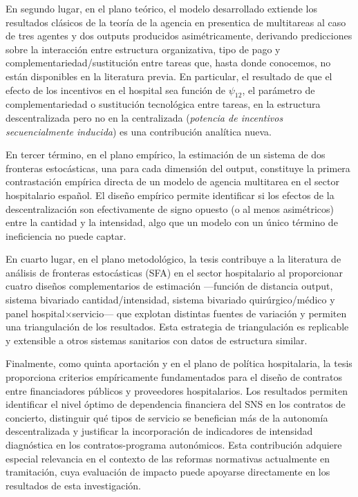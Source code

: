 En segundo lugar, en el plano teórico, el modelo desarrollado extiende los resultados clásicos de la teoría de la agencia en presentica de multitareas \citep{holmstrom1991} al caso de tres agentes y dos outputs producidos asimétricamente, derivando predicciones sobre la interacción entre estructura organizativa, tipo de pago y complementariedad/sustitución entre tareas que, hasta donde conocemos, no están disponibles en la literatura previa. En particular, el resultado de que el efecto de  los incentivos en el hospital sea función de $\psi_{12}$, el parámetro de complementariedad o sustitución tecnológica entre tareas, en la estructura descentralizada pero no en la centralizada (\textit{potencia de incentivos secuencialmente inducida}) es una contribución analítica nueva.

En tercer término, en el plano empírico, la estimación de un sistema de dos fronteras estocásticas, una para cada dimensión del output, constituye la primera contrastación empírica directa de un modelo de agencia multitarea en el sector hospitalario español. El diseño empírico permite identificar si los efectos de la descentralización son efectivamente de signo opuesto (o al menos asimétricos) entre la cantidad y la intensidad, algo que un modelo con un único término de ineficiencia no puede captar. %

En cuarto lugar, en el plano metodológico, la tesis contribuye a la literatura de análisis de fronteras estocásticas (SFA) en el sector hospitalario al proporcionar cuatro diseños complementarios de estimación ---función de distancia output, sistema bivariado cantidad/intensidad, sistema bivariado quirúrgico/médico y panel hospital$\times$servicio--- que explotan distintas fuentes de variación y permiten una triangulación de los resultados. Esta estrategia de triangulación es replicable y extensible a otros sistemas sanitarios con datos de estructura similar.

Finalmente, como quinta aportación y en el plano de política hospitalaria, la tesis 
proporciona criterios empíricamente fundamentados para el diseño 
de contratos entre financiadores públicos y proveedores 
hospitalarios. Los resultados permiten identificar el nivel 
óptimo de dependencia financiera del SNS en los contratos de 
concierto, distinguir qué tipos de servicio se benefician más 
de la autonomía descentralizada y justificar la incorporación 
de indicadores de intensidad diagnóstica en los contratos-programa 
autonómicos. Esta contribución adquiere especial relevancia en 
el contexto de las reformas normativas actualmente en tramitación, 
cuya evaluación de impacto puede apoyarse directamente en los 
resultados de esta investigación.
